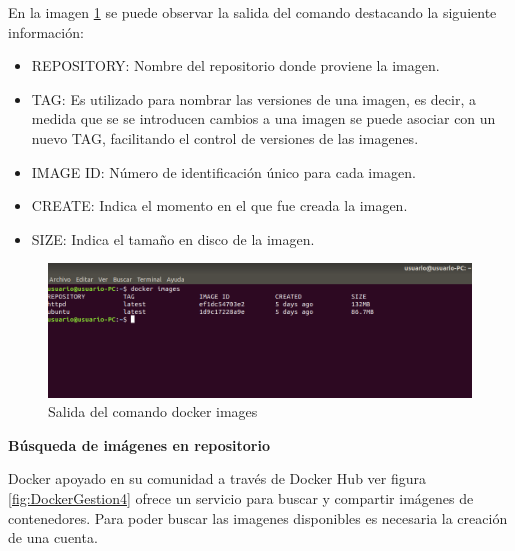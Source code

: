 En la imagen \ref{fig:DockerGestion2} se puede observar la salida del comando destacando la siguiente información:
\begin{itemize}
    \item REPOSITORY: Nombre del repositorio donde proviene la imagen.
    \item TAG: Es utilizado para nombrar las versiones de una imagen, es decir, a medida que se se introducen cambios a una imagen se puede asociar con un nuevo TAG, facilitando el control de versiones de las imagenes.
    \item IMAGE ID: Número de identificación único para cada imagen.
    \item CREATE: Indica el momento en el que fue creada la imagen.
    \item SIZE: Indica el tamaño en disco de la imagen.
\end{itemize}

\begin{figure}[!hbtp]
	\centering
	\includegraphics[width=\linewidth]{RE05_Docker/Gestion_basica/REDocker_Gestion2.png}
	\vspace{-0.2cm}
	\caption{Salida del comando docker images}
	\label{fig:DockerGestion2}
\end{figure}
\textbf{Búsqueda de imágenes en repositorio}

Docker apoyado en su comunidad a través de Docker Hub ver figura \ref{fig:DockerGestion4} ofrece un servicio para buscar y compartir imágenes de contenedores. Para poder buscar las imagenes disponibles es necesaria la creación de una cuenta.

